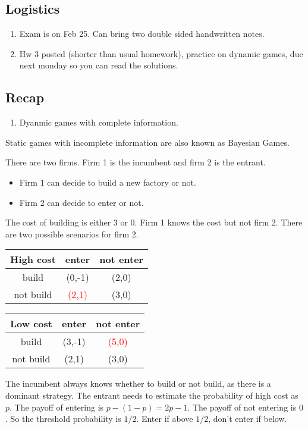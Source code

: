 \newsection
\subsection*{Logistics}
\begin{enumerate}
    \item Exam is on Feb 25. Can bring two double sided handwritten notes. 
    \item Hw 3 posted (shorter than usual homework), practice on dynamic games, due next monday so you can read the solutions.
\end{enumerate}


\subsection*{Recap}
\begin{enumerate}
    \item Dyanmic games with complete information.
\end{enumerate}

Static games with incomplete information are also known as Bayesian Games.
\begin{aexample}{}{}
    There are two firms. Firm 1 is the incumbent and firm 2 is the entrant.
    \begin{itemize}
        \item Firm 1 can decide to build a new factory or not.
        \item Firm 2 can decide to enter or not.
    \end{itemize}
    The cost of building is either 3 or 0. Firm 1 knows the cost but not firm 2. There are two possible scenarios for firm 2.
    \begin{center}
        \begin{tabular}{|c|c c|}
            \hline High cost & enter & not enter \\
            \hline 
            build & (0,-1) & (2,0)\\
            \hline
            not build & \textcolor{red}{(2,1)} & (3,0)\\\hline
        \end{tabular} 
        \linebreak[3pt]
        
        \begin{tabular}{|c|c c|}
            \hline Low cost & enter & not enter \\
            \hline 
            build & (3,-1) & \textcolor{red}{(5,0)}\\
            \hline
            not build & (2,1) & (3,0)\\\hline
        \end{tabular}
    \end{center}
\end{aexample}
The incumbent always knows whether to build or not build, as there is a dominant strategy. The entrant needs to estimate the probability of high cost as $p$.
The payoff of entering is $p-(1-p)=2p-1$. The payoff of not entering is $0$. So the threshold probability is $1/2$. Enter if above $1/2$, don't enter if below.

